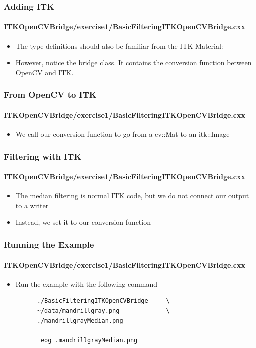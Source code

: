 \begin{frame}
\frametitle{Adding ITK}
\framesubtitle{ITKOpenCVBridge/exercise1/BasicFilteringITKOpenCVBridge.cxx}
\begin{itemize}
\item The type definitions should also be familiar from the ITK
  Material:
\item However, notice the bridge class. It contains the conversion function
between OpenCV and ITK.
\end{itemize}
\end{frame}

\begin{frame}
\frametitle{From OpenCV to ITK}
\framesubtitle{ITKOpenCVBridge/exercise1/BasicFilteringITKOpenCVBridge.cxx}
\begin{itemize}
\item We call our conversion function to go from a cv::Mat to an
  itk::Image
\end{itemize}
\end{frame}

\begin{frame}
\frametitle{Filtering with ITK}
\framesubtitle{ITKOpenCVBridge/exercise1/BasicFilteringITKOpenCVBridge.cxx}
\begin{itemize}
\item The median filtering is normal ITK code, but we do not connect our
output to a writer
\pause
\item Instead, we set it to our conversion function
\end{itemize}
\end{frame}

\begin{frame}[fragile]
\frametitle{Running the Example}
\framesubtitle{ITKOpenCVBridge/exercise1/BasicFilteringITKOpenCVBridge.cxx}
\begin{itemize}
\item Run the example with the following command
\begin{verbatim}
      ./BasicFilteringITKOpenCVBridge     \
      ~/data/mandrillgray.png             \
      ./mandrillgrayMedian.png            

       eog .mandrillgrayMedian.png
\end{verbatim}
\end{itemize}
\end{frame}


